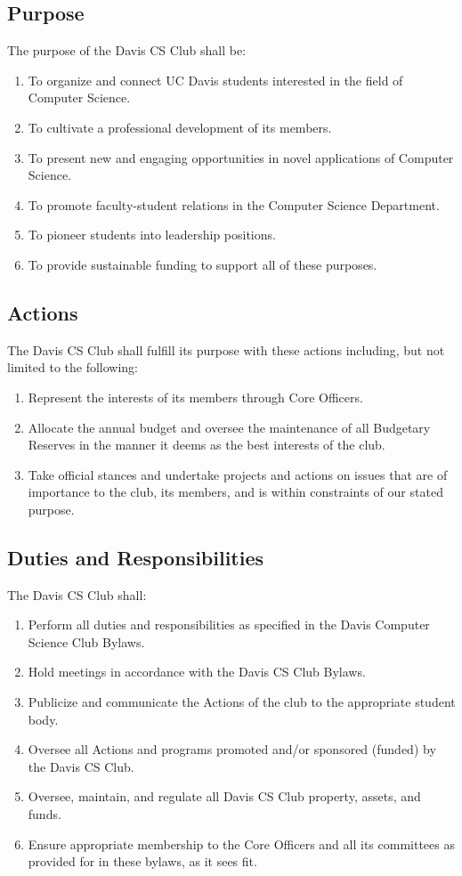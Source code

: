 \documentclass{article}
\newenvironment{li}{
\begin{enumerate}
  \setlength{\itemsep}{1pt}
  \setlength{\parskip}{0pt}
  \setlength{\parsep}{0pt}
}{\end{enumerate}}
\begin{document}
\subsection{Purpose}
The purpose of the Davis CS Club shall be:
\begin{li}
\item To organize and connect UC Davis students interested in the field of Computer Science.
\item To cultivate a professional development of its members.
\item To present new and engaging opportunities in novel applications of Computer Science.
\item To promote faculty-student relations in the Computer Science Department.
\item To pioneer students into leadership positions.
\item To provide sustainable funding to support all of these purposes.
\end{li}

\subsection{Actions}
The Davis CS Club shall fulfill its purpose with these actions including, but not limited to the following:
\begin{li}
\item Represent the interests of its members through Core Officers.
\item Allocate the annual budget and oversee the maintenance of all Budgetary Reserves in the manner it deems as the best interests of the club.
\item Take official stances and undertake projects and actions on issues that are of importance to the club, its members, and is within constraints of our stated purpose.
\end{li}

\subsection{Duties and Responsibilities}
The Davis CS Club shall:
\begin{li}
\item Perform all duties and responsibilities as specified in the Davis Computer Science Club Bylaws.
\item Hold meetings in accordance with the Davis CS Club Bylaws.
\item Publicize and communicate the Actions of the club to the appropriate student body.
\item Oversee all Actions and programs promoted and/or sponsored (funded) by the Davis CS Club.
\item Oversee, maintain, and regulate all Davis CS Club property, assets, and funds.
\item Ensure appropriate membership to the Core Officers and all its committees as provided for in these bylaws, as it sees fit.
\end{li}
\end{document}
